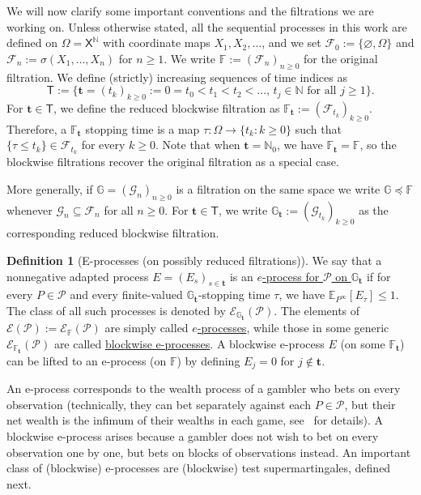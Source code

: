 \documentclass[11pt]{article}
\newcommand{\E}{\mathbb{E}}
\newcommand{\Pcal}{\mathcal{P}}
\newcommand{\X}{\mathsf{X}}
\newcommand{\bbF}{\mathbb F}
\newcommand{\bbG}{\mathbb G}
\newcommand{\bbH}{\mathbb H}
\newcommand{\bt}{\mathbf t}
\newcommand{\Tdet}{\mathsf T}
\theoremstyle{definition}
\newtheorem{definition}[theorem]{Definition}
\theoremstyle{definition}
\begin{document}
We will now clarify some important conventions and the filtrations we are working on. Unless otherwise stated, all the sequential processes in this work are defined on $\Omega=\X^{\mathbb N}$ with coordinate maps $X_1, X_2, \dots$, and we set $\mathcal F_0:=\{\varnothing, \Omega\}$ and $\mathcal F_n:=\sigma(X_1,\dots,X_n)$ for $n\ge 1$. We write $\bbF:=(\mathcal F_n)_{n\ge 0}$ for the original filtration. We define (strictly) increasing sequences of time indices as 
\[
\Tdet:=\Big\{\bt=(t_k)_{k\ge 0}:= 0=t_0<t_1<t_2<\dots,\, t_j\in\mathbb N \text{ for all $j \geq 1$}
\Bigr\}.
\]
For $\bt\in\Tdet$, we define the reduced blockwise filtration as $\bbF_{\bt}:=(\mathcal F_{t_k})_{k\ge 0}$. Therefore, a $\bbF_{\bt}$ stopping time is a map $\tau:\Omega\to\{t_k:k\ge 0\}$ such that $\{\tau\le t_k\}\in \mathcal F_{t_k}$ for every $k\ge 0$. Note that when $\bt = \mathbb N_0$, we have $\bbF_{\bt} = \bbF$, so the blockwise filtrations recover the original filtration as a special case. 

More generally, if $\bbG=(\mathcal G_n)_{n\ge 0}$ is a filtration on the same space we write $\bbG\preceq \bbF$ whenever $\mathcal G_n\subseteq \mathcal F_n$ for all $n\ge 0$. For $\bt\in\Tdet$, we write $\bbG_{\bt}:=(\mathcal G_{t_k})_{k\ge 0}$ as the corresponding reduced blockwise filtration.

\begin{definition}[E-processes (on possibly  reduced filtrations)]\label{def:eprocess}
We say that a nonnegative adapted process $E=(E_s)_{s\in \bt}$ is an \underline{$e$-process for $\Pcal$ on $\bbG_{\bt}$} if for every $P\in\Pcal$ and every finite-valued $\bbG_\bt$-stopping time $\tau$, we have $\E_{P^{\infty}}[E_{\tau}]\le 1$. The class of all such processes is denoted by $\mathcal E_{\bbG_\bt}(\Pcal)$. 
The elements of $\mathcal E(\Pcal):= \mathcal E_{\bbF}(\Pcal)$ 
are simply called \underline{$e$-processes}, while those in some generic $\mathcal E_{\bbF_\bt}(\Pcal)$ are called \underline{blockwise e-processes}. A blockwise e-process $E$ (on some $\bbF_\bt$) can be lifted to an e-process (on $\bbF$) by defining $E_j = 0$ for $j \notin \bt$. 
\end{definition}

An e-process corresponds to the wealth process of a gambler who bets on every observation (technically, they can bet separately against each $P \in \Pcal$, but their net wealth is the infimum of their wealths in each game, see~\cite{ramdas2022testing} for details).
A blockwise e-process arises because a gambler does not wish to bet on every observation one by one, but bets on blocks of observations instead. An important class of (blockwise) e-processes are (blockwise) test supermartingales, defined next.
\end{document}
